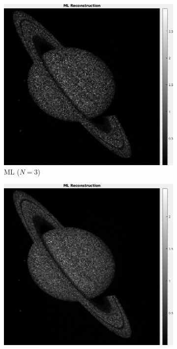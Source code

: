 \documentclass[a4paper, 11pt]{article}
\begin{document}
\begin{figure}[h]
\centering
    \begin{subfigure}[b]{0.22\textwidth}
        \includegraphics[width=\textwidth]{../Figures/MLReconstructionNoiseSigma1e-3Realization3.png}
        \caption{ML ($N=3$)}
        \label{fig:MLN1}
    \end{subfigure}
    \begin{subfigure}[b]{0.22\textwidth}
        \includegraphics[width=\textwidth]{../Figures/MLReconstructionNoiseSigma1e-3Realization6.png}

\end{subfigure}
\end{figure}
\end{document}
